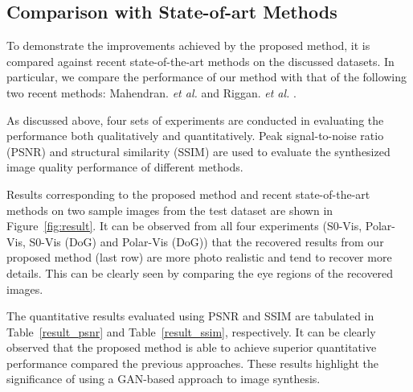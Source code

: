 \documentclass[10pt,twocolumn,letterpaper]{article}
\begin{document}
\subsection{Comparison with State-of-art Methods}  

To demonstrate the improvements achieved by the proposed method, it is compared against recent state-of-the-art methods on the discussed datasets.   In particular, we compare the performance of our method with that of the following two recent methods: Mahendran.  \emph{et al.} \cite{inverting_cnn}
and  Riggan. \emph{et al.} \cite{btas_2016}. 

As discussed above, four sets of experiments are conducted in evaluating the performance both qualitatively and quantitatively.   Peak signal-to-noise ratio (PSNR) and structural similarity (SSIM) \cite{ssim} are used to evaluate the synthesized image quality  performance of different methods.  

Results corresponding to the proposed method and recent state-of-the-art methods  on two sample images from the test dataset are shown in Figure~\ref{fig:result}. It can be observed from all four experiments (S0-Vis, Polar-Vis, S0-Vis (DoG) and Polar-Vis (DoG)) that the recovered results from our proposed method (last row) are more photo realistic and tend to recover more details. This can be clearly seen by comparing the eye regions of the recovered images. 


The quantitative results evaluated using PSNR and SSIM are tabulated in Table~\ref{result_psnr} and Table~\ref{result_ssim}, respectively.  It
can be clearly observed that the proposed method is able to achieve superior quantitative performance compared the previous approaches.  These results highlight the significance of using a GAN-based approach to image synthesis.  

\begin{table}[htp!]
\centering
\caption{The average PSNR (dB) results corresponding to different methods.}
\label{result_psnr}
\end{table}
\end{document}
